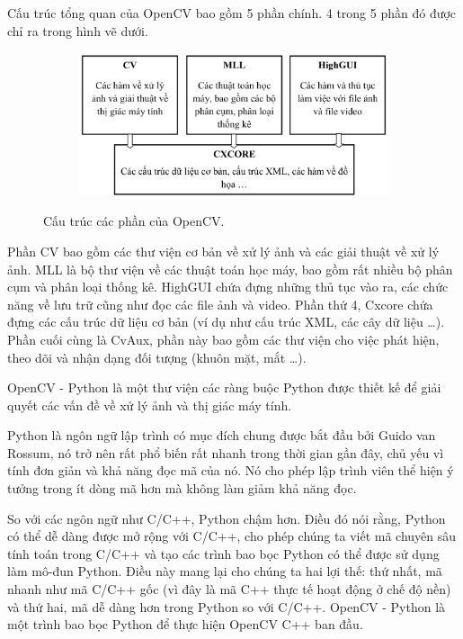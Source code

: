 Cấu trúc tổng quan của OpenCV bao gồm 5 phần chính. 4 trong 5 phần đó được chỉ ra
trong hình vẽ dưới.

\begin{figure}
    \begin{subfigure}{0.7\textwidth}
        \includegraphics[width=0.99\linewidth]{Chapters/items/chap2_1.jpg}
        \caption{}
        \label{fig: chap2_1}
    \end{subfigure}
    \caption{Cấu trúc các phần của OpenCV.}
\end{figure}

Phần CV bao gồm các thư viện cơ bản về xử lý ảnh và các giải thuật về xử lý ảnh.
MLL là bộ thư viện về các thuật toán học máy, bao gồm rất nhiều bộ phân cụm và phân
loại thống kê. HighGUI chứa đựng những thủ tục vào ra, các chức năng về lưu trữ cũng
như đọc các file ảnh và video. Phần thứ 4, Cxcore chứa đựng các cấu trúc dữ liệu
cơ bản (ví dụ như cấu trúc XML, các cây dữ liệu …). Phần cuối cùng là CvAux, phần này
bao gồm các thư viện cho việc phát hiện, theo dõi và nhận dạng đối tượng (khuôn mặt, mắt …).

OpenCV - Python là một thư viện các ràng buộc Python được thiết kế để giải quyết các vấn đề
về xử lý ảnh và thị giác máy tính.

Python là ngôn ngữ lập trình có mục đích chung được bắt đầu bởi Guido van Rossum,
nó trở nên rất phổ biến rất nhanh trong thời gian gần đây, chủ yếu vì tính đơn giản
và khả năng đọc mã của nó. Nó cho phép lập trình viên thể hiện ý tưởng trong ít dòng
mã hơn mà không làm giảm khả năng đọc.

So với các ngôn ngữ như C/C++, Python chậm hơn. Điều đó nói rằng, Python có thể dễ dàng
được mở rộng với C/C++, cho phép chúng ta viết mã chuyên sâu tính toán trong C/C++
và tạo các trình bao bọc Python có thể được sử dụng làm mô-đun Python.
Điều này mang lại cho chúng ta hai lợi thế: thứ nhất, mã nhanh như mã C/C++ gốc
(vì đây là mã C++ thực tế hoạt động ở chế độ nền) và thứ hai, mã dễ dàng hơn trong
Python so với C/C++. OpenCV - Python là một trình bao bọc Python để thực hiện OpenCV C++
ban đầu.

